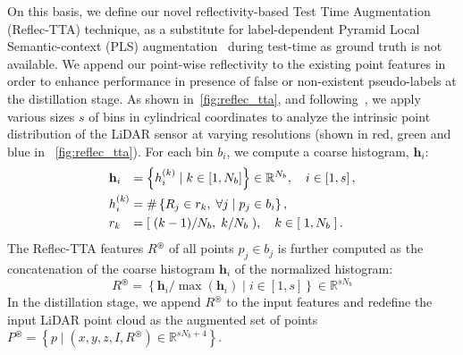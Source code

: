 \documentclass[10pt,twocolumn,letterpaper]{article}
\begin{document}
On this basis, we define our novel reflectivity-based Test Time Augmentation (Reflec-TTA) technique, as a substitute for label-dependent Pyramid Local Semantic-context (PLS) augmentation~\cite{Unal_2022_CVPR} during test-time as ground truth is not available. We append our point-wise reflectivity to the existing point features in order to enhance performance in presence of false or non-existent pseudo-labels at the distillation stage. As shown in~\cref{fig:reflec_tta},  and following~\cite{Unal_2022_CVPR}, we apply various sizes $s$ of bins in cylindrical coordinates to analyze the intrinsic point distribution of the LiDAR sensor at varying resolutions (shown in red, green and blue in ~\cref{fig:reflec_tta}). For each bin $b_i$, we compute a coarse histogram, $\mathbf{h}_i$:
\begin{equation}\label{equ:bins_histo}
    \begin{aligned}
        &\mathbf{h}_i& &\hspace{-10pt} = \left\{ h_i^{(k)} \mid k \in \left[1, N_{b}\right]  \right\} \in \mathbb{R}^{N_{b}}, \quad i \in \left[1, s\right], \\
        &h_i^{(k)}& &\hspace{-10pt} =\#\left\{R_j \in r_k, \; \forall j \mid p_j \in b_i\right\}, \\
        &r_k& &\hspace{-10pt} = [\; (k-1)/N_{b}, \; k/N_{b}\;), \quad k \in \left[\; 1, N_{b} \;\right].
    \end{aligned}
\end{equation}
The Reflec-TTA features $R^\circledast$ of all points $p_j \in b_j$ is further computed as the concatenation of the coarse histogram $\mathbf{h}_i$ of the normalized histogram:
\begin{equation}\label{equ:reflectta}
    R^\circledast=\left\{\mathbf{h}_i / \max\left(\mathbf{h}_i\right)  \mid i \in \left[1, s\right] \right\} \in \mathbb{R}^{s N_{b}}
\end{equation}
In the distillation stage, we append $R^\circledast$ to the input features and redefine the input LiDAR point cloud as the augmented set of points $P^\circledast = \left\{p \mid \left(x,y,z,I,R^\circledast\right) \in \mathbb{R}^{s N_{b}+4} \right\} $.




\subsection{\textbf{\textls[-2]{{\samplfull}}}}
\label{sec:MRFD}
\end{document}
